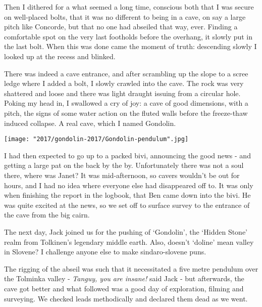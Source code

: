 Then I dithered for a what seemed a long time, conscious both that I was secure on well-placed bolts, that it was no different to being in a cave, on say a large pitch like Concorde, but that no one had abseiled that way, ever. Finding a comfortable spot on the very last footholds before the overhang, it slowly put in the last bolt. When this was done came the moment of truth: descending slowly I looked up at the recess and blinked.

There was indeed a cave entrance, and after scrambling up the slope to a scree ledge where I added a bolt, I slowly crawled into the cave. The rock was very shattered and loose and there was light draught issuing from a circular hole. Poking my head in, I swallowed a cry of joy: a cave of good dimensions, with a pitch, the signs of some water action on the fluted walls before the freeze-thaw induced collapse. A real cave, which I named Gondolin.

\begin{figure*}[b!]
\checkoddpage \ifoddpage \forcerectofloat \else \forceversofloat \fi
\centering
        \texttt{[image: "2017/gondolin-2017/Gondolin-pendulum".jpg]}
        \caption{} \label{gondolin pendulum}
\end{figure*}

I had then expected to go up to a packed bivi, announcing the good news - and getting a large pat on the back by the by. Unfortunately there was not a soul there, where was Janet? It was mid-afternoon, so cavers wouldn’t be out for hours, and I had no idea where everyone else had disappeared off to. It was only when finishing the report in the logbook, that Ben came down into the bivi. He was quite excited at the news, so we set off to surface survey to the entrance of the cave from the big cairn. 

The next day, Jack joined us for the pushing of ‘Gondolin’, the ‘Hidden Stone’ realm from Tolkinen’s legendary middle earth. Also, doesn’t ‘doline’ mean valley in Slovene? I challenge anyone else to make sindaro-slovene puns. 

The rigging of the abseil was such that it necessitated a five metre pendulum over the Tolminka valley - \emph{Tanguy, you are insane!} said Jack - but afterwards, the cave got better and what followed was a good day of exploration, filming and surveying. We checked leads methodically and declared them dead as we went. 

